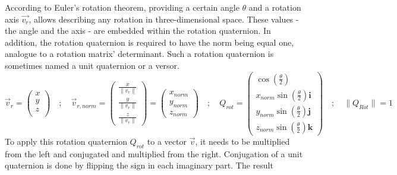 According to Euler's rotation theorem, providing a certain angle $\theta$ and a rotation axis $\vec{v_{r}}$, allows describing any rotation in three-dimensional space.
These values - the angle and the axis - are embedded within the rotation quaternion. In addition, the rotation quaternion is required to have the norm being equal one, analogue to a rotation matrix' determinant. Such a rotation quaternion is sometimes named a unit quaternion or a versor.
\begin{equation*}
    \vec{v}_{r} =
    \begin{pmatrix}
        x \\
        y \\
        z \\
    \end{pmatrix}
    \quad ; \quad
    \vec{v}_{r,norm} =
    \begin{pmatrix}
        \frac{x}{\lVert v_{r} \rVert} \\
        \frac{y}{\lVert v_{r} \rVert} \\
        \frac{z}{\lVert v_{r} \rVert}
    \end{pmatrix} =
    \begin{pmatrix}
        x_{norm} \\
        y_{norm} \\
        z_{norm}
    \end{pmatrix}
    \quad ; \quad
    Q_{rot}=
    \begin{pmatrix}
        \cos (\frac{\theta}{2} )                 \\
        x_{norm}\sin(\frac{\theta}{2})\textbf{i} \\
        y_{norm}\sin(\frac{\theta}{2})\textbf{j} \\
        z_{norm}\sin(\frac{\theta}{2})\textbf{k}
    \end{pmatrix}
    \quad ; \quad
    \lVert Q_{Rot} \rVert = 1
\end{equation*}
To apply this rotation quaternion $Q_{rot}$ to a vector $\vec{v}$, it needs to be multiplied from the left and conjugated and multiplied from the right. Conjugation of a unit quaternion is done by flipping the sign in each imaginary part. The result 
